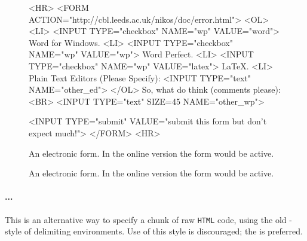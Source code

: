 \begin{htmlonly}
\begin{figure}[h]
\begin{makeimage}
\end{makeimage}
\begin{rawhtml}
<HR>
<FORM ACTION="http://cbl.leeds.ac.uk/nikos/doc/error.html">
<OL>
<LI> <INPUT TYPE="checkbox" NAME="wp" VALUE="word"> Word for
Windows.
<LI> <INPUT TYPE="checkbox" NAME="wp" VALUE="wp"> Word Perfect.
<LI> <INPUT TYPE="checkbox" NAME="wp" VALUE="latex"> LaTeX.
<LI> Plain Text Editors (Please Specify): <INPUT TYPE="text" NAME="other_ed">
</OL>
So, what do think (comments please): <BR>
<INPUT TYPE="text" SIZE=45 NAME="other_wp">

<INPUT TYPE="submit" VALUE="submit this form but don't expect much!">
</FORM>
<HR>
\end{rawhtml}
\caption{An electronic form. 
 In the online version the form would be active.}\label{fig_eform}
\end{figure}
\end{htmlonly}
%
\begin{latexonly}
\begin{figure}[h]
    \begin{center}
    \end{center}
  \caption{An electronic form.
  In the online version the form would be active.}
  \label{fig_eform}
\end{figure}
\end{latexonly}



%
\paragraph*{...\label{endrawhtml}}
This is an alternative way to specify a chunk of raw \texttt{HTML} code,
using the old \AmS-style of delimiting environments.
Use of this style is discouraged; 
the   is preferred.%

